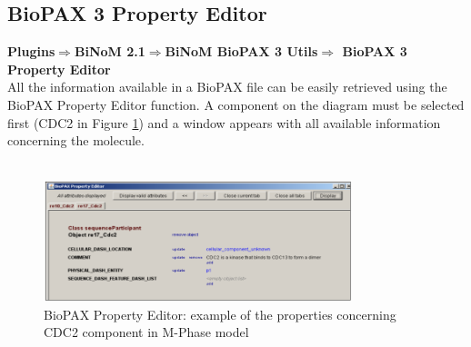 \subsection{BioPAX 3 Property Editor} \label{BioPAX_Property_Editor}
\textbf{Plugins$\Rightarrow$BiNoM 2.1$\Rightarrow$BiNoM BioPAX 3 Utils$\Rightarrow$ BioPAX 3 Property Editor}\\

All the information available in a BioPAX file can be easily retrieved using the
BioPAX Property Editor function. A component on the diagram must be selected
first (CDC2 in Figure \ref{BioPAX_Property_Editor_cdc2}) and a window appears
with all available information concerning the molecule.\\\\

\begin{figure}[h]
\centering
\includegraphics[width=0.8\textwidth]{graphics/BioPAX_Property_Editor_cdc2}
\caption{BioPAX Property Editor: example of the properties concerning CDC2
component in M-Phase model}
\label{BioPAX_Property_Editor_cdc2}
\end{figure}



